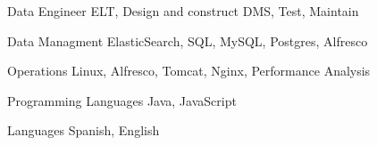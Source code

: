 


\begin{cvskills}


\cvskill
{Data Engineer} %
{ELT, Design and construct DMS, Test, Maintain} %




\cvskill
{Data Managment} %
{ElasticSearch, SQL, MySQL, Postgres, Alfresco} %


\cvskill
{Operations} %
{Linux, Alfresco, Tomcat, Nginx, Performance Analysis} %


\cvskill
{Programming Languages} %
{Java, JavaScript} %


\cvskill
{Languages} %
{Spanish, English} %




\end{cvskills}

